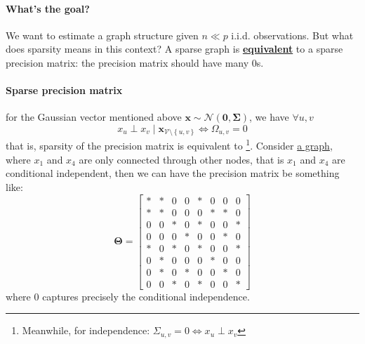 \documentclass[twoside]{article}
\begin{document}
\paragraph*{What's the goal?} We want to estimate a  graph structure given $n\ll p$ i.i.d. observations. But what does sparsity means in this context? A sparse graph is \textbf{\underline{equivalent}} to a sparse precision matrix: the precision matrix should have many 0s.

\paragraph*{Sparse precision matrix} for the Gaussian vector mentioned above $\mathbf{x}\sim\mathcal{N}(\mathbf{0},\boldsymbol{\Sigma})$, we have $\forall u,v$ $$ x_u \perp x_v \mid \mathbf{x}_{\mathcal{V}\setminus \left\{ u,v \right\} } \Leftrightarrow \Omega_{u,v}=0 $$
that is, sparsity of the precision matrix is equivalent to \footnote{Meanwhile, for independence: $\Sigma_{u,v}=0\Leftrightarrow x_u \perp x_v$}. Consider \hyperref[fig:sparse_precision_graph]{a graph}, where $x_1$ and $x_4$ are only connected through other nodes, that is $x_1$ and $x_4$ are conditional independent, then we can have the precision matrix be something like:
$$
\boldsymbol{\Theta} = \begin{bmatrix}
    * & * & 0 & 0 & * & 0 & 0 & 0 \\
    * & * & 0 & 0 & 0 & * & * & 0 \\
    0 & 0 & * & 0 & * & 0 & 0 & * \\
    0 & 0 & 0 & * & 0 & 0 & * & 0 \\
    * & 0 & * & 0 & * & 0 & 0 & * \\
    0 & * & 0 & 0 & 0 & * & 0 & 0 \\
    0 & * & 0 & * & 0 & 0 & * & 0 \\
    0 & 0 & * & 0 & * & 0 & 0 & *
\end{bmatrix}
$$
where 0 captures precisely the conditional independence.
\end{document}
